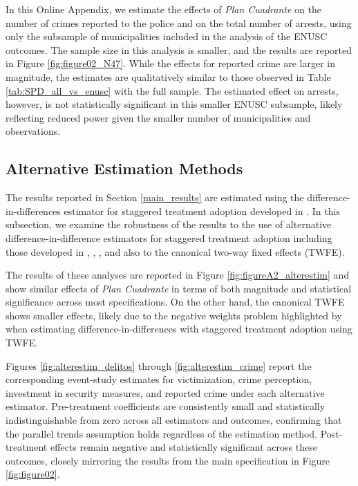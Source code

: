 In this Online Appendix, we estimate the effects of \emph{Plan Cuadrante} on the number of crimes reported to the police and on the total number of arrests, using only the subsample of municipalities included in the analysis of the ENUSC outcomes. The sample size in this analysis is smaller, and the results are reported in Figure \ref{fig:figure02_N47}. While the effects for reported crime are larger in magnitude, the estimates are qualitatively similar to those observed in Table \ref{tab:SPD_all_vs_enusc} with the full sample. The estimated effect on arrests, however, is not statistically significant in this smaller ENUSC subsample, likely reflecting reduced power given the smaller number of municipalities and observations.





\clearpage

\clearpage

\subsection{Alternative Estimation Methods}

The results reported in Section \ref{main_results} are estimated using the difference-in-differences estimator for staggered treatment adoption developed in \citet{Callaway}. In this subsection, we examine the robustness of the results to the use of alternative difference-in-difference estimators for staggered treatment adoption including those developed in \citet{Chaisemartin}, \citet{Gardner}, \citet{wooldridge2023simple}, and also to the canonical two-way fixed effects (TWFE). 

The results of these analyses are reported in Figure \ref{fig:figureA2_alterestim} and show similar effects of \emph{Plan Cuadrante} in terms of both magnitude and statistical significance across most specifications. On the other hand, the canonical TWFE shows smaller effects, likely due to the negative weights problem highlighted by \citet{GoodmanBacon} when estimating difference-in-differences with staggered treatment adoption using TWFE.




Figures \ref{fig:alterestim_delitos} through \ref{fig:alterestim_crime} report the corresponding event-study estimates for victimization, crime perception, investment in security measures, and reported crime under each alternative estimator. Pre-treatment coefficients are consistently small and statistically indistinguishable from zero across all estimators and outcomes, confirming that the parallel trends assumption holds regardless of the estimation method. Post-treatment effects remain negative and statistically significant across these outcomes, closely mirroring the results from the main specification in Figure \ref{fig:figure02}.

